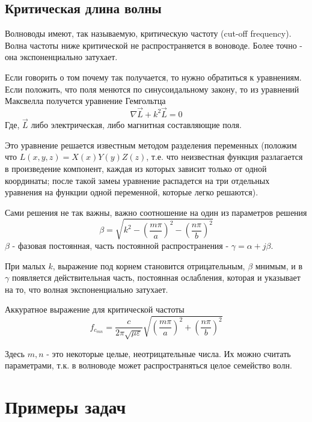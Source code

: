 \documentclass[a4paper,12pt]{article}
\numberwithin{equation}{section}
\begin{document}
\subsection{Критическая длина волны}
Волноводы имеют, так называемую, критическую частоту (cut-off frequency).
Волна частоты ниже критической не распространяется в воноводе.
Более точно - она экспоненциально затухает.

Если говорить о том почему так получается, то нужно обратиться к уравнениям.
Если положить, что поля менются по синусоидальному закону, то из уравнений Максвелла получется уравнение Гемгольтца
$$\nabla \vec{L} + k^2 \vec{L} = 0$$
Где, $\vec{L}$ либо электрическая, либо магнитная составляющие поля.

Это уравнение решается известным методом разделения переменных (положим что $L(x, y, z) = X(x) Y(y) Z(z)$, т.е. что неизвестная функция разлагается в произведение компонент, каждая из которых зависит только от одной координаты; после такой замеы уравнение распадется на три отдельных уравнения на функции одной переменной, которые легко решаются).

Сами решения не так важны, важно соотношение на один из параметров решения
$$\beta = \sqrt{k^2 - \left(\frac{m\pi}{a}\right)^2 - \left(\frac{n\pi}{b}\right)^2}$$
$\beta$ - фазовая постоянная, часть постоянной распространения - $\gamma = \alpha + j\beta$.

При малых $k$, выражение под корнем становится отрицательным, $\beta$ мнимым, и в $\gamma$ появляется действительная часть, постоянная ослабления, которая и указывает на то, что волная экспоненциально затухает.

Аккуратное выражение для критической частоты
\begin{equation} \label{eq:fcmn}
    f_{c_{mn}}= \frac{c}{2\pi \sqrt{\mu \varepsilon}} \sqrt{\left(\frac{m\pi}{a}\right)^2 + \left(\frac{n\pi}{b}\right)^2}
\end{equation}

Здесь $m, n$ - это некоторые целые, неотрицательные числа.
Их можно считать параметрами, т.к. в волноводе может распространяться целое семейство волн.


\section{Примеры задач}
\end{document}
